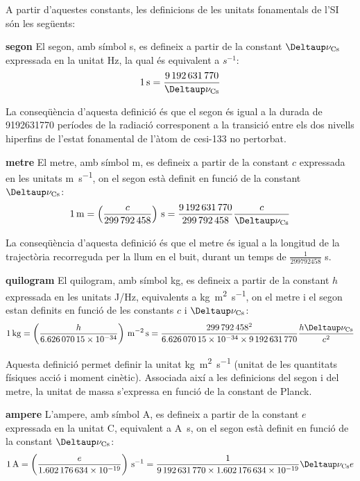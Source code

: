 A partir d'aquestes constants, les definicions de les unitats fonamentals de l'SI són les següents:
\begin{list}{}
   {\setlength{\labelwidth}{22mm} \setlength{\leftmargin}{22mm} \setlength{\labelsep}{2mm}}
   \item[\textbf{segon}] El segon, amb símbol s, es defineix a partir de la constant $\Deltaup\nu\ped{Cs}$ expressada en la unitat Hz, la qual és equivalent a $\unit{s^{-1}}$:
       \[
            \qty{1}{s} = \frac{\num{9192631770}}{\Deltaup\nu\ped{Cs}}
       \]

    La conseqüència d'aquesta definició és que el segon és igual a la durada de \num{9192631770} períodes de la
   radiació corresponent a la transició entre els dos nivells
  hiperfins de l'estat fonamental de l'àtom de cesi-133 no pertorbat.

   \item[\textbf{metre}]  El metre, amb símbol m, es defineix a partir de la constant $c$ expressada en les unitats \unit{m.s^{-1}}, on el segon està definit en funció de la constant  $\Deltaup\nu\ped{Cs}$:
       \[
            \qty{1}{m} = \left(\frac{c}{\num{299792458}}\right)\unit{\,s} = \frac{\num{9192631770}}{\num{299792458}}\frac{c}{\Deltaup\nu\ped{Cs}}
       \]

    La conseqüència d'aquesta definició és que el metre és igual a la longitud de la trajectòria recorreguda per la llum
   en el buit, durant un temps de $\frac{1}{\num{299792458}}$ s.

   \item[\textbf{quilogram}] El quilogram, amb símbol kg, es defineix a partir de la constant $h$ expressada en les unitats \unit{J/Hz}, equivalents a \unit{kg.m^2.s^{-1}}, on el metre i el segon estan definits en funció de les constants $c$ i $\Deltaup\nu\ped{Cs}$:
       \[
            \qty{1}{kg} = \left(\frac{h}{\num{6,62607015 e-34}}\right)\unit{\,m^{-2}.s} = \frac{\num{299792458}^2}{\num{6,62607015 e-34}\times\num{9192631770}}\frac{h\Deltaup\nu\ped{Cs}}{c^2}
       \]

   Aquesta definició permet definir la unitat \unit{kg.m^2.s^{-1}} (unitat de les quantitats físiques acció i moment cinètic). Associada així a les definicions del segon i del metre,  la unitat de massa s'expressa en funció  de la constant de Planck.


   \item[\textbf{ampere}] L'ampere, amb símbol A, es defineix a partir de la constant $e$ expressada en la unitat C,  equivalent a \unit{A.s}, on el segon està definit en funció de la constant  $\Deltaup\nu\ped{Cs}$:
       \[
            \qty{1}{A} = \left(\frac{e}{\num{1,602176634 e-19}}\right)\unit{\,s^{-1}} = \frac{1}{\num{9192631770}\times\num{1,602176634 e-19}} \Deltaup\nu\ped{Cs} e
       \]


\end{list}

